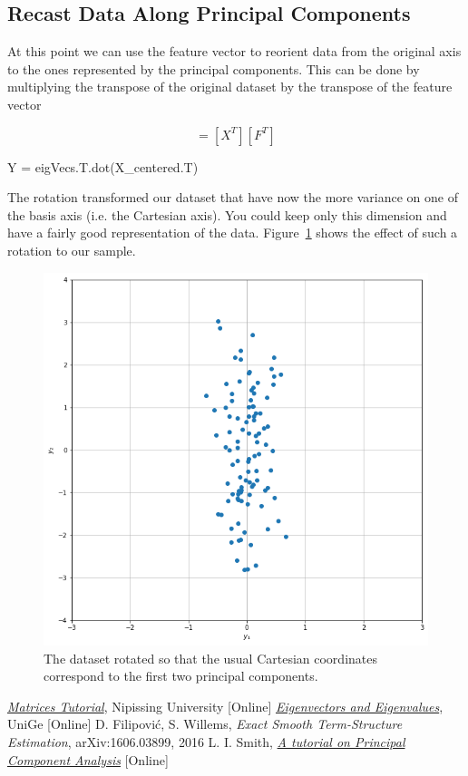 \subsection{Recast Data Along Principal Components}
At this point we can use the feature vector to reorient data from the original axis to the ones represented by the principal components. 
This can be done by multiplying the transpose of the original dataset by the transpose of the feature vector

\begin{equation}
[Y] = [X^T][F^T]
\end{equation}

\begin{ipython}
Y = eigVecs.T.dot(X_centered.T)
\end{ipython}

The rotation transformed our dataset that have now the more variance on one of the basis axis (i.e. the Cartesian axis). 
You could keep only this dimension and have a fairly good representation of the data. Figure~\ref{fig:pca_rotated} shows the effect of such a rotation to our sample.
\clearpage
\begin{figure}[htb]
	\centering
	\includegraphics[width=0.5\linewidth]{figures/pca_rotated}
	\caption{The dataset rotated so that the usual Cartesian coordinates
		correspond to the first two principal components.}
	\label{fig:pca_rotated}
\end{figure}

\begin{thebibliography}{9}
\href{https://algebra.nipissingu.ca/tutorials/matrices.html}{\emph{Matrices Tutorial}}, Nipissing University [Online]
\href{http://macosa.dima.unige.it/mat/calculus/eigenstuff.htm}{\emph{Eigenvectors and Eigenvalues}}, UniGe [Online]
 D. Filipović, S. Willems, \emph{Exact Smooth Term-Structure Estimation}, arXiv:1606.03899, 2016
 L. I. Smith, \href{http://www.iro.umontreal.ca/~pift6080/H09/documents/papers/pca_tutorial.pdf}{\emph{A tutorial on Principal Component Analysis}} [Online]
\end{thebibliography}






